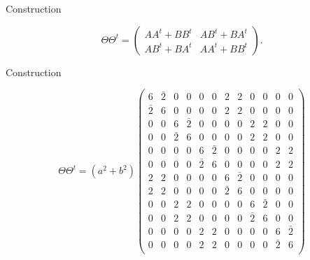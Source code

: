 \documentclass{beamer}
\begin{document}
\begin{frame}{Construction}

  \[
    \Theta\Theta^t =
    \begin{pmatrix}
      AA^t + BB^t & AB^t + BA^t \\ AB^t + BA^t & AA^t + BB^t
    \end{pmatrix}.
  \]
  
\end{frame}

\begin{frame}{Construction}

  \[
    \Theta\Theta^t = (a^2+b^2)
    \left(
      \begin{array}{cccccc|cccccc}
        6&\bar{2}&0&0&0&0&2&2&0&0&0&0\\
        \bar{2}&6&0&0&0&0&2&2&0&0&0&0\\
        0&0&6&\bar{2}&0&0&0&0&2&2&0&0\\
        0&0&\bar{2}&6&0&0&0&0&2&2&0&0\\
        0&0&0&0&6&\bar{2}&0&0&0&0&2&2\\
        0&0&0&0&\bar{2}&6&0&0&0&0&2&2\\ \hline
        2&2&0&0&0&0&6&\bar{2}&0&0&0&0\\
        2&2&0&0&0&0&\bar{2}&6&0&0&0&0\\
        0&0&2&2&0&0&0&0&6&\bar{2}&0&0\\
        0&0&2&2&0&0&0&0&\bar{2}&6&0&0\\
        0&0&0&0&2&2&0&0&0&0&6&\bar{2}\\
        0&0&0&0&2&2&0&0&0&0&\bar{2}&6\\
      \end{array}
    \right)
  \]
  
\end{frame}
\end{document}
